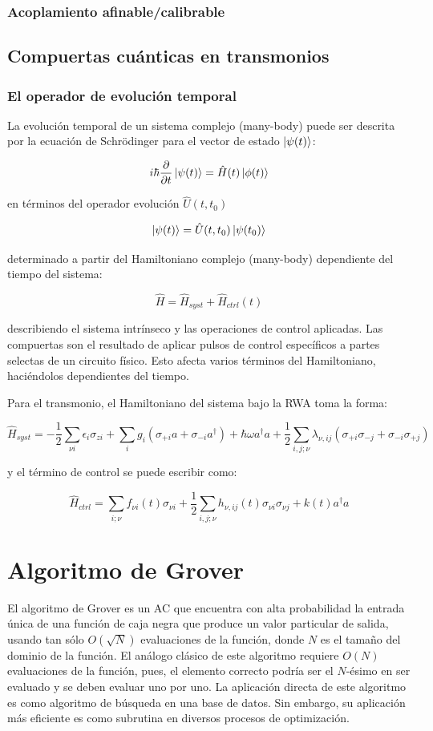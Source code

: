 \documentclass[11pt, spanish]{report}
\begin{document}
\subsection{Acoplamiento afinable/calibrable}

\section{Compuertas cuánticas en transmonios}

\subsection{El operador de evolución temporal}
La evolución temporal de un sistema complejo (many-body) puede ser descrita por la ecuación de Schrödinger para el vector de estado $\ket{\psi(t)}$:

\[
i \hbar \frac{\partial}{\partial t} \ket{\psi(t)} = \hat{H}(t) \ket{\phi(t)}
\]

en términos del operador evolución $\hat{U}(t,t_0)$

\[
\ket{\psi(t)} = \hat{U}(t,t_0) \ket{\psi(t_0)}
\]

determinado a partir del Hamiltoniano complejo (many-body) dependiente del tiempo del sistema:

\[
\hat{H} = \hat{H}_{syst} + \hat{H}_{ctrl}(t)
\]

describiendo el sistema intrínseco y las operaciones de control aplicadas. Las compuertas son el resultado de aplicar pulsos de control específicos a partes selectas de un circuito físico. Esto afecta varios términos del Hamiltoniano, haciéndolos dependientes del tiempo.

Para el transmonio, el Hamiltoniano del sistema bajo la RWA toma la forma:

\[
\hat{H}_{syst} = -\frac{1}{2} \sum\limits_{\nu i} \epsilon_i \sigma_{z i} + \sum\limits_{i} g_i (\sigma_{+ i} a + \sigma_{- i} a^\dag) + \hbar \omega a^\dag a + \frac{1}{2} \sum\limits_{i,j;\nu} \lambda_{\nu, ij} (\sigma_{+ i} \sigma_{- j} + \sigma_{- i} \sigma_{+ j})
\]

y el término de control se puede escribir como:

\[
\hat{H}_{ctrl} = \sum\limits_{i; \nu} f_{\nu i}(t) \sigma_{\nu i} + \frac{1}{2} \sum\limits_{i,j;\nu} h_{\nu, ij}(t) \sigma_{\nu i} \sigma_{\nu j} + k(t) a^\dag a
\]



\chapter{Algoritmo de Grover}
El algoritmo de Grover es un AC que encuentra con alta probabilidad la entrada única de una función de caja negra que produce un valor particular de salida, usando tan sólo $O(\sqrt{N})$ evaluaciones de la función, donde $N$ es el tamaño del dominio de la función. El análogo clásico de este algoritmo requiere $O(N)$ evaluaciones de la función, pues, el elemento correcto podría ser el $N$-ésimo en ser evaluado y se deben evaluar uno por uno. La aplicación directa de este algoritmo es como algoritmo de búsqueda en una base de datos. Sin embargo, su aplicación más eficiente es como subrutina en diversos procesos de optimización.
\end{document}
